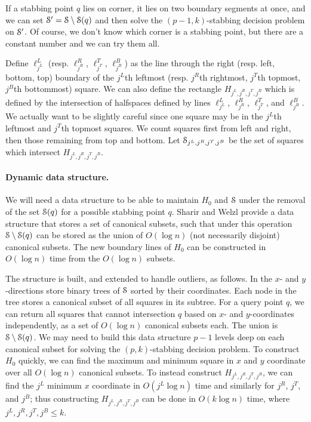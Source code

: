 \documentclass[11pt]{myclass}
\newcommand{\EuS}{\ensuremath{\EuScript{S}}}
\begin{document}
If a stabbing point $q$ lies on corner, it lies on two boundary segments at once, and we can set $\EuS^\prime = \EuS \setminus \EuS(q)$ and then solve the $(p-1,k)$-stabbing decision problem on $\EuS^\prime$.  Of course, we don't know which corner is a stabbing point, but there are a constant number and we can try them all.  

Define $\ell^L_{j^L}$ (resp. $\ell^R_{j^R}$, $\ell^T_{j^T}$, $\ell^B_{j^B}$) as the line through the right (resp. left, bottom, top) boundary of the $j^L$th leftmost (resp. $j^R$th rightmost, $j^T$th topmost, $j^B$th bottommost) square.  
We can also define the rectangle $H_{j^L, j^R, j^T, j^B}$ which is defined by the intersection of halfspaces defined by lines $\ell^L_{j^L}$, $\ell^R_{j^R}$, $\ell^T_{j^T}$, and $\ell^B_{j^B}$.  
We actually want to be slightly careful since one square may be in the $j^L$th leftmost and $j^T$th topmost squares.  We count squares first from left and right, then those remaining from top and bottom.  
Let $\EuS_{j^L, j^R, j^T, j^B}$ be the set of squares which intersect $H_{j^L, j^R, j^T, j^B}$.  


\paragraph{Dynamic data structure.}
We will need a data structure to be able to maintain $H_0$ and $\EuS$ under the removal of the set $\EuS(q)$ for a possible stabbing point $q$.  Sharir and Welzl \cite{SW96} provide a data structure that stores a set of canonical subsets, such that under this operation $\EuS \setminus \EuS(q)$ can be stored as the union of $O(\log n)$ (not necessarily disjoint) canonical subsets.  The new boundary lines of $H_0$ can be constructed in $O(\log n)$ time from the $O(\log n)$ subsets.  

The structure is built, and extended to handle outliers, as follows.
In the $x$- and $y$-directions store binary trees of $\EuS$ sorted by their coordinates.  Each node in the tree stores a canonical subset of all squares in its subtree.  For a query point $q$, we can return all squares that cannot intersection $q$ based on $x$- and $y$-coordinates independently, as a set of $O(\log n)$ canonical subsets each.  The union is $\EuS \setminus \EuS(q)$.  
We may need to build this data structure $p-1$ levels deep on each canonical subset for solving the $(p,k)$-stabbing decision problem.  
To construct $H_0$ quickly, we can find the maximum and minimum square in $x$ and $y$ coordinate over all $O(\log n)$ canonical subsets.  To instead construct $H_{j^L, j^R, j^T, j^B}$, we can find the $j^L$ minimum $x$ coordinate in $O(j^L \log n)$ time and similarly for $j^R$, $j^T$, and $j^B$; thus constructing $H_{j^L, j^R, j^T, j^B}$ can be done in $O(k \log n)$ time, where $j^L, j^R, j^T, j^B \leq k$.  
\end{document}
